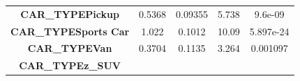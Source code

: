 \documentclass[]{article}
\begin{document}
\begin{longtable}[]{@{}ccccc@{}}
\begin{minipage}[t]{0.33\columnwidth}
\textbf{CAR\_TYPEPickup}\strut
\end{minipage} & \begin{minipage}[t]{0.14\columnwidth}\centering\strut
0.5368\strut
\end{minipage} & \begin{minipage}[t]{0.14\columnwidth}\centering\strut
0.09355\strut
\end{minipage} & \begin{minipage}[t]{0.11\columnwidth}\centering\strut
5.738\strut
\end{minipage} & \begin{minipage}[t]{0.12\columnwidth}\centering\strut
9.6e-09\strut
\end{minipage}\tabularnewline
\begin{minipage}[t]{0.33\columnwidth}\centering\strut
\textbf{CAR\_TYPESports Car}\strut
\end{minipage} & \begin{minipage}[t]{0.14\columnwidth}\centering\strut
1.022\strut
\end{minipage} & \begin{minipage}[t]{0.14\columnwidth}\centering\strut
0.1012\strut
\end{minipage} & \begin{minipage}[t]{0.11\columnwidth}\centering\strut
10.09\strut
\end{minipage} & \begin{minipage}[t]{0.12\columnwidth}\centering\strut
5.897e-24\strut
\end{minipage}\tabularnewline
\begin{minipage}[t]{0.33\columnwidth}\centering\strut
\textbf{CAR\_TYPEVan}\strut
\end{minipage} & \begin{minipage}[t]{0.14\columnwidth}\centering\strut
0.3704\strut
\end{minipage} & \begin{minipage}[t]{0.14\columnwidth}\centering\strut
0.1135\strut
\end{minipage} & \begin{minipage}[t]{0.11\columnwidth}\centering\strut
3.264\strut
\end{minipage} & \begin{minipage}[t]{0.12\columnwidth}\centering\strut
0.001097\strut
\end{minipage}\tabularnewline
\begin{minipage}[t]{0.33\columnwidth}\centering\strut
\textbf{CAR\_TYPEz\_SUV}\strut
\end{minipage} & \begin{minipage}[t]{0.14\columnwidth}\centering\strut

\end{minipage}
\end{longtable}
\end{document}
